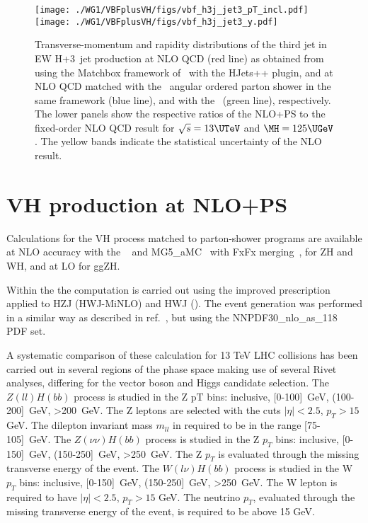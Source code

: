 %
\begin{figure}
\texttt{[image: ./WG1/VBFplusVH/figs/vbf\_h3j\_jet3\_pT\_incl.pdf]}
\hfill
\texttt{[image: ./WG1/VBFplusVH/figs/vbf\_h3j\_jet3\_y.pdf]}
\caption{Transverse-momentum and rapidity distributions of the third jet in EW H+3~jet production at NLO QCD (red line)  as obtained from using the \textsf{Matchbox} framework 
of \ with the \textsf{HJets++} plugin, and at NLO QCD matched with the 
\ angular ordered parton shower in the same framework (blue line), 
and with the \POWHEGBOX\ (green line), respectively. The lower panels show the respective ratios of the NLO+PS to the fixed-order NLO QCD result for $\sqrt{s}=13\UTeV$ and $\MH=125\UGeV$. The yellow bands indicate the statistical uncertainty of the NLO result. }
\label{fig:SM-VBF-H3j-jet3}
\end{figure}
%


\clearpage
\section{VH production at NLO+PS}
%
Calculations for the VH process matched to parton-shower programs are
available at NLO accuracy with the \POWHEGBOX~\cite{Luisoni:2013kna} and
{\sc MG5\_aMC}~\cite{} with FxFx
merging~\cite{Frederix:2012ps,Frederix:2015eii}, for ZH and WH, and at
LO for ggZH.
%

Within the \POWHEGBOX{} the computation is carried out using the
improved \MINLO{} prescription~\cite{Hamilton:2012rf} applied to {\sc
  HZJ} ({\sc HWJ-MiNLO}) and {\sc HWJ} (\HWJMINLO). The event
generation was performed in a similar way as described in
ref.~\cite{Luisoni:2013kna}, but using the
NNPDF30\_nlo\_as\_118~\cite{Ball:2014uwa} PDF set.


A systematic comparison of these calculation for 13 TeV LHC collisions
has been carried out in several regions of the phase space
making use of several Rivet~\cite{rivet} analyses, differing for the vector boson and Higgs candidate selection.
The $Z(ll)H(bb)$ process is studied in the Z pT bins: inclusive, [0-100]~GeV, (100-200]~GeV, >200~GeV.
The Z leptons are selected with the cuts $|\eta| <2.5$, $p_{T} > 15$ GeV.
The dilepton invariant mass $m_{ll}$ in required to be in the range [75-105]~GeV.
The $Z(\nu\nu)H(bb)$ process is studied in the Z $p_{T}$ bins: inclusive, [0-150]~GeV, (150-250]~GeV, >250~GeV.
The Z $p_{T}$ is evaluated through the missing transverse energy of the event.
The $W(l\nu)H(bb)$ process is studied in the W $p_{T}$ bins: inclusive, [0-150]~GeV, (150-250]~GeV, >250~GeV.
The W lepton is required to have $|\eta|<2.5$, $p_{T} > 15$ GeV.
The neutrino $p_{T}$, evaluated through the missing transverse energy of the event, is required to be above 15 GeV.

